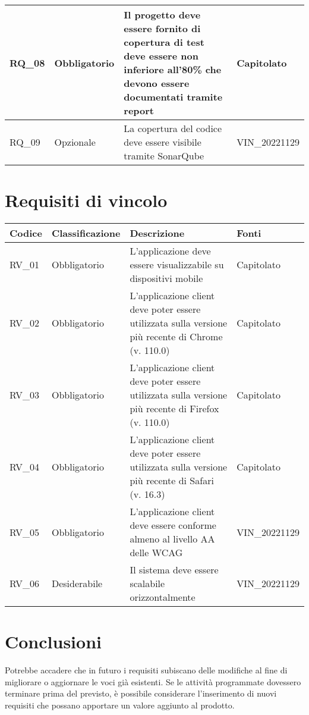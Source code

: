 \begin{center}
\begin{xltabular}{\linewidth}{|l|l|X|l|}
    \hline
    RQ\_08 & Obbligatorio & Il progetto deve essere fornito di copertura di test deve essere non inferiore all'80\% che devono essere documentati tramite report & Capitolato \\

    \hline
    RQ\_09 & Opzionale & La copertura del codice deve essere visibile tramite SonarQube & VIN\_20221129 \\

    \hline

    \end{xltabular}

\end{center}

\section{Requisiti di vincolo}

\begin{center}
    \begin{xltabular}{\linewidth}{|l|l|X|l|}
    \hline
    \textbf{Codice} & \textbf{Classificazione} & \textbf{Descrizione} & \textbf{Fonti} \\
    \hline
    RV\_01 & Obbligatorio & L'applicazione deve essere visualizzabile su dispositivi mobile & Capitolato \\

    \hline
    RV\_02 & Obbligatorio & L'applicazione client deve poter essere utilizzata sulla versione più recente di Chrome (v. 110.0) & Capitolato \\

    \hline
    RV\_03 & Obbligatorio & L'applicazione client deve poter essere utilizzata sulla versione più recente di Firefox (v. 110.0) & Capitolato \\

    \hline
    RV\_04 & Obbligatorio & L'applicazione client deve poter essere utilizzata sulla versione più recente di Safari (v. 16.3) & Capitolato \\

    \hline
    RV\_05 & Obbligatorio & L'applicazione client deve essere conforme almeno al livello AA delle WCAG  & VIN\_20221129 \\

    \hline
    RV\_06 & Desiderabile & Il sistema deve essere scalabile orizzontalmente  & VIN\_20221129 \\

    \hline

    \end{xltabular}
    \end{center}

\section{Conclusioni}

Potrebbe accadere che in futuro i requisiti subiscano delle modifiche al fine di migliorare o aggiornare le voci già esistenti.
Se le attività programmate dovessero terminare prima del previsto, è possibile considerare l'inserimento di nuovi requisiti che possano apportare un valore aggiunto al prodotto.